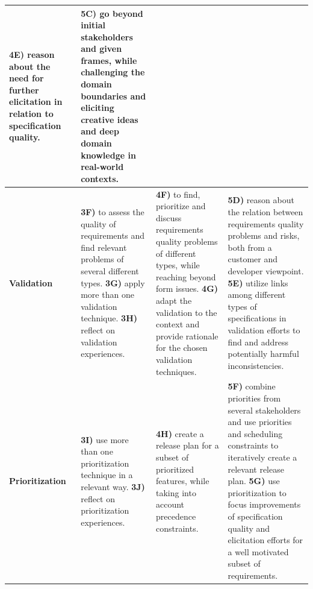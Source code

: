 \documentclass[10pt,a4paper]{article}
\begin{document}
\begin{table}
\begin{adjustbox}{width=1.05\textwidth}
\begin{tabular}{| p{2.3cm} |p{5.5cm} | p{5.0cm} | p{5.7cm} |}
	{\bf 4E)} reason about the need for further elicitation in relation to specification quality.& 

	{\bf 5C)} go beyond initial stakeholders and given frames, while challenging the domain boundaries and eliciting creative ideas and deep domain  knowledge in real-world contexts.
\\ \hline

{\bf Validation}  & 
	
	{\bf 3F)} to assess the quality of requirements and find relevant  problems of several different types. \newline
	{\bf 3G)} apply more than one validation technique. \newline
	{\bf 3H)} reflect on validation experiences.& 
	
	{\bf 4F)} to find, prioritize and discuss requirements quality problems of different types, while reaching beyond form issues. \newline
	{\bf 4G)} adapt the validation to the context and provide rationale for the chosen validation techniques. & 
	
	{\bf 5D)} reason about the relation between requirements quality problems and risks, both from a customer and developer viewpoint. \newline
	{\bf 5E)} utilize links among different types of specifications in validation efforts to find and address potentially harmful inconsistencies. \newline
\\ \hline

{\bf Prioritization}  & 
	
	{\bf 3I)} use more than one prioritization technique in a relevant way. \newline
	{\bf 3J)} reflect on prioritization experiences. &	
	{\bf 4H)} create a release plan for a subset of prioritized features, while taking into account precedence constraints. \newline
& 
	
	{\bf 5F)} combine priorities from several stakeholders and use priorities and scheduling constraints to iteratively create a relevant release plan.\newline	   
	{\bf 5G)} use prioritization to focus improvements of specification quality and elicitation efforts for a well motivated subset of requirements.%
\\ \hline

\end{tabular}
\end{adjustbox}
\end{table}
\end{document}
